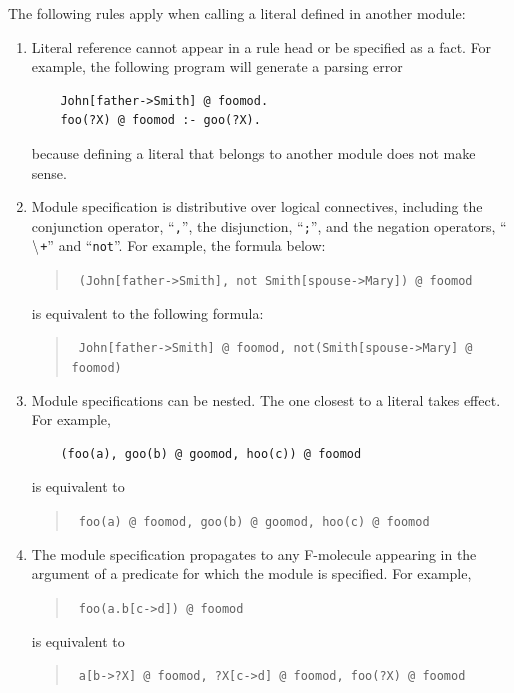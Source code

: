 \documentclass[11pt]{article}
\newcommand{\NAF}{\mbox{\tt \ensuremath{\tt\backslash}+}\xspace}
\newcommand{\TNOT}{{{\tt not}}\xspace}
\begin{document}
The following rules apply when calling a literal defined in another module:
\begin{enumerate}
\item Literal reference cannot appear in a rule head or be specified as
  a fact. For example, the following program will generate
  a parsing error
  \begin{verbatim}
    John[father->Smith] @ foomod.
    foo(?X) @ foomod :- goo(?X).
  \end{verbatim}
  because defining a literal that belongs to another module does not make
  sense.
  
\item Module specification is distributive over logical connectives,
  including the conjunction operator, ``\verb|,|'', the disjunction,
  ``\verb|;|'', and the negation operators, ``\NAF'' and
  ``\TNOT''. For example, the formula below:
  \begin{quote}
    {\tt
    (John[father->Smith], \TNOT Smith[spouse->Mary]) @ foomod
    }
  \end{quote}
  is equivalent to the following formula:
  \begin{quote}
    {\tt
    John[father->Smith] @ foomod, \TNOT (Smith[spouse->Mary] @ foomod)
    }
  \end{quote}

\item Module specifications can be nested. The one closest to a literal
  takes effect. For example,
  \begin{verbatim}
    (foo(a), goo(b) @ goomod, hoo(c)) @ foomod
  \end{verbatim}
  is equivalent to
  \begin{quote}
    {\tt
      foo(a) @ foomod, goo(b) @ goomod, hoo(c) @ foomod
    }
  \end{quote}
  
\item The module specification propagates to any F-molecule appearing
  in the argument of a predicate for which the module is
  specified. For example,
  \begin{quote}
    {\tt
    foo(a.b[c->d]) @ foomod
    }
  \end{quote}
  is equivalent to
  \begin{quote}
    {\tt
    a[b->?X] @ foomod, ?X[c->d] @ foomod, foo(?X) @ foomod
    }
  \end{quote}
  

\end{enumerate}
\end{document}
